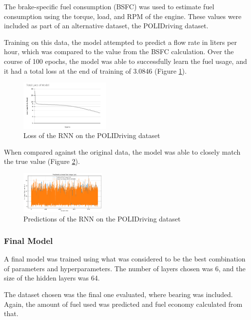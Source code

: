 \documentclass[letterpaper]{article}
\begin{document}
The brake-specific fuel consumption (BSFC) was used to estimate fuel 
consumption using the torque, load, and RPM of the engine. These values 
were included as part of an alternative dataset, the POLIDriving dataset.

Training on this data, the model attempted to predict a flow rate in liters 
per hour, which was compared to the value from the BSFC calculation. Over 
the course of 100 epochs, the model was able to successfully learn the fuel 
usage, and it had a total loss at the end of training of 3.0846 
(Figure \ref{fig:lossrnn}).

\begin{figure}[h!]
    \centering
    \includegraphics[width=0.4\textwidth]{figures/loss.jpg}
    \caption{Loss of the RNN on the POLIDriving dataset}
    \label{fig:lossrnn}
\end{figure}

When compared against the original data, the model was able to closely 
match the true value (Figure \ref{fig:predictionrnn}).\\

\begin{figure}[h!]
    \centering
    \includegraphics[width=0.38\textwidth]{figures/rnn_predictions.png}
    \caption{Predictions of the RNN on the POLIDriving dataset}
    \label{fig:predictionrnn}
\end{figure}

\subsubsection*{Final Model}

A final model was trained using what was considered to be the best 
combination of parameters and hyperparameters. The number of layers chosen 
was 6, and the size of the hidden layers was 64.

The dataset chosen was the final one evaluated, where bearing was 
included. Again, the amount of fuel used was predicted and fuel economy 
calculated from that.
\end{document}
